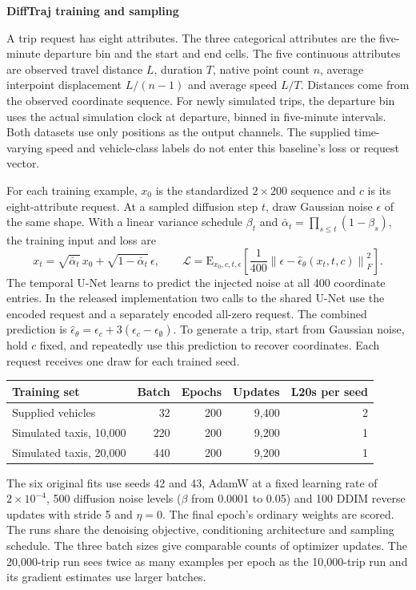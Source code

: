 \documentclass[11pt,a4paper]{article}
\newcommand{\heading}[1]{{\Large\sffamily\bfseries\color{ink}#1\par}\vspace{3pt}}
\begin{document}
\newpage
\heading{DiffTraj training and sampling}
A trip request has eight attributes. The three categorical attributes are the five-minute departure bin and the start and end cells. The five continuous attributes are observed travel distance $L$, duration $T$, native point count $n$, average interpoint displacement $L/(n-1)$ and average speed $L/T$. Distances come from the observed coordinate sequence. For newly simulated trips, the departure bin uses the actual simulation clock at departure, binned in five-minute intervals. Both datasets use only positions as the output channels. The supplied time-varying speed and vehicle-class labels do not enter this baseline's loss or request vector.

For each training example, $x_0$ is the standardized $2\times200$ sequence and $c$ is its eight-attribute request. At a sampled diffusion step $t$, draw Gaussian noise $\epsilon$ of the same shape. With a linear variance schedule $\beta_t$ and $\bar\alpha_t=\prod_{s\leq t}(1-\beta_s)$, the training input and loss are
\[
 x_t=\sqrt{\bar\alpha_t}\,x_0+\sqrt{1-\bar\alpha_t}\,\epsilon,\qquad
 \mathcal{L}=\mathrm E_{x_0,c,t,\epsilon}\!\left[\frac{1}{400}\left\|\epsilon-\hat\epsilon_\theta(x_t,t,c)\right\|_F^2\right].
\]
The temporal U-Net learns to predict the injected noise at all 400 coordinate entries. In the released implementation two calls to the shared U-Net use the encoded request and a separately encoded all-zero request. The combined prediction is $\hat\epsilon_\theta=\epsilon_c+3(\epsilon_c-\epsilon_\emptyset)$. To generate a trip, start from Gaussian noise, hold $c$ fixed, and repeatedly use this prediction to recover coordinates. Each request receives one draw for each trained seed.

\begin{center}\small
\begin{tabular}{@{}lrrrr@{}}\toprule
Training set & Batch & Epochs & Updates & L20s per seed\\\midrule
Supplied vehicles & 32 & 200 & 9,400 & 2\\
Simulated taxis, 10,000 & 220 & 200 & 9,200 & 1\\
Simulated taxis, 20,000 & 440 & 200 & 9,200 & 1\\\bottomrule
\end{tabular}\end{center}
The six original fits use seeds 42 and 43, AdamW at a fixed learning rate of $2\times10^{-4}$, 500 diffusion noise levels ($\beta$ from 0.0001 to 0.05) and 100 DDIM reverse updates with stride 5 and $\eta=0$. The final epoch's ordinary weights are scored. The runs share the denoising objective, conditioning architecture and sampling schedule. The three batch sizes give comparable counts of optimizer updates. The 20,000-trip run sees twice as many examples per epoch as the 10,000-trip run and its gradient estimates use larger batches.
\end{document}
